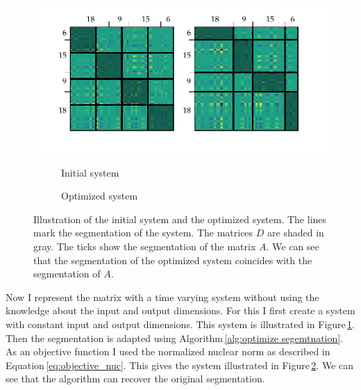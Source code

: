 \documentclass[doctype=mastersthesis,BCOR=15mm,biblatex]{ldvbook}%
\begin{document}
\begin{figure}[!htb]
	\centering
	\includegraphics[trim=0.4cm 0.9cm 0 0, clip,width=\textwidth]{Plots/example_move.pdf}
	\begin{subfigure}[b]{0.35\textwidth}
		\caption{Initial system}
		\label{fig:example_move_a}
	\end{subfigure}
	\hspace{0.8cm}
	\begin{subfigure}[b]{0.35\textwidth}
		\caption{Optimized system}
		\label{fig:example_move_b}
	\end{subfigure}
	\caption{Illustration of the initial system and the optimized system.
		The lines mark the segmentation of the system.
		The matrices $D$ are shaded in gray.
		The ticks show the segmentation of the matrix $A$. 
		We can see that the segmentation of the optimized system coincides with the segmentation of $A$.}
	\label{fig:example_move}
\end{figure}
Now I represent the matrix with a time varying system without using the knowledge about the input and output dimensions.
For this I first create a system with constant input and output dimensions.
This system is illustrated in Figure\,\ref{fig:example_move_a}.
Then the segmentation is adapted using Algorithm\,\ref{alg:optimize segemtnation}.
As an objective function I used the normalized nuclear norm as described in Equation\,\ref{eq:objective_nuc}.
This gives the system illustrated in Figure\,\ref{fig:example_move_b}.
We can see that the algorithm can recover the original segmentation.
\end{document}
